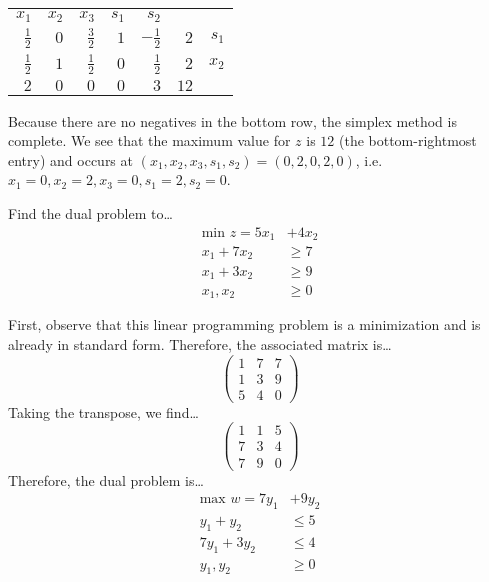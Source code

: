 \documentclass[11pt,letterpaper]{article}
\begin{document}
	\begin{table}[!ht]
	\centering
	\begin{tabular}{rrrrrr r}
	{\small $x_1$} & {\small $x_2$} & {\small $x_3$} & {\small $s_1$} & {\small $s_2$} \\
	$\frac{1}{2}$ & $0$ & $\frac{3}{2}$ & $1$ & \multicolumn{1}{r|}{$-\frac{1}{2}$} & $2$ & {\small $s_1$} \\
	$\frac{1}{2}$ & $1$ & $\frac{1}{2}$ & $0$ & \multicolumn{1}{r|}{$\frac{1}{2}$} & $2$ & {\small $x_2$} \\ \cline{1-6}
	$2$ & $0$ & $0$ & $0$ & \multicolumn{1}{r|}{$3$} & $12$ 
	\end{tabular}
	\end{table}

Because there are no negatives in the bottom row, the simplex method is complete. We see that the maximum value for $z$ is $12$ (the bottom-rightmost entry) and occurs at $(x_1, x_2, x_3, s_1, s_2)= (0, 2, 0, 2, 0)$, i.e. $x_1= 0, x_2= 2, x_3= 0, s_1= 2, s_2= 0$. 



\newpage



 Find the dual problem to\dots
	\[
	\begin{aligned}
	\text{min } z= 5x_1 &+ 4x_2 \\
	x_1 + 7x_2&\geq 7 \\
	x_1 + 3x_2&\geq 9 \\
	x_1, x_2&\geq 0 
	\end{aligned}
	\] \pspace

\sol First, observe that this linear programming problem is a minimization and is already in standard form. Therefore, the associated matrix is\dots
	\[
	\begin{pmatrix}
	1 & 7 & 7 \\
	1 & 3 & 9 \\
	5 & 4 & 0 
	\end{pmatrix}
	\]
Taking the transpose, we find\dots
	\[
	\begin{pmatrix}
	1 & 1 & 5 \\
	7 & 3 & 4 \\
	7 & 9 & 0 
	\end{pmatrix}
	\]
Therefore, the dual problem is\dots
	\[
	\begin{aligned}
	\text{max }  w= 7y_1 &+ 9y_2 \\
	y_1 + y_2&\leq 5 \\
	7y_1 + 3y_2&\leq 4 \\
	y_1, y_2&\geq 0
	\end{aligned}
	\] 
\end{document}
